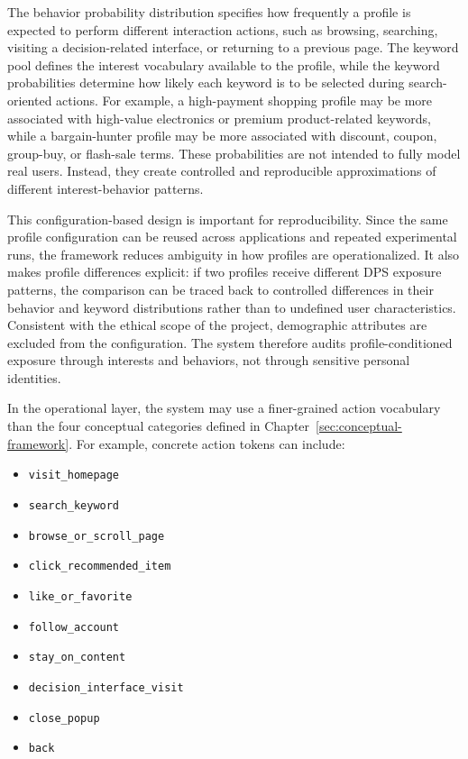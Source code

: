 The behavior probability distribution specifies how frequently a profile is expected to perform different interaction actions, such as browsing, searching, visiting a decision-related interface, or returning to a previous page. The keyword pool defines the interest vocabulary available to the profile, while the keyword probabilities determine how likely each keyword is to be selected during search-oriented actions. For example, a high-payment shopping profile may be more associated with high-value electronics or premium product-related keywords, while a bargain-hunter profile may be more associated with discount, coupon, group-buy, or flash-sale terms. These probabilities are not intended to fully model real users. Instead, they create controlled and reproducible approximations of different interest-behavior patterns.

This configuration-based design is important for reproducibility. Since the same profile configuration can be reused across applications and repeated experimental runs, the framework reduces ambiguity in how profiles are operationalized. It also makes profile differences explicit: if two profiles receive different DPS exposure patterns, the comparison can be traced back to controlled differences in their behavior and keyword distributions rather than to undefined user characteristics. Consistent with the ethical scope of the project, demographic attributes are excluded from the configuration. The system therefore audits profile-conditioned exposure through interests and behaviors, not through sensitive personal identities.

In the operational layer, the system may use a finer-grained action vocabulary than the four conceptual categories defined in Chapter~\ref{sec:conceptual-framework}. For example, concrete action tokens can include:

\begin{itemize}
    \item \texttt{visit\_homepage}
    \item \texttt{search\_keyword}
    \item \texttt{browse\_or\_scroll\_page}
    \item \texttt{click\_recommended\_item}
    \item \texttt{like\_or\_favorite}
    \item \texttt{follow\_account}
    \item \texttt{stay\_on\_content}
    \item \texttt{decision\_interface\_visit}
    \item \texttt{close\_popup}
    \item \texttt{back}
\end{itemize}

